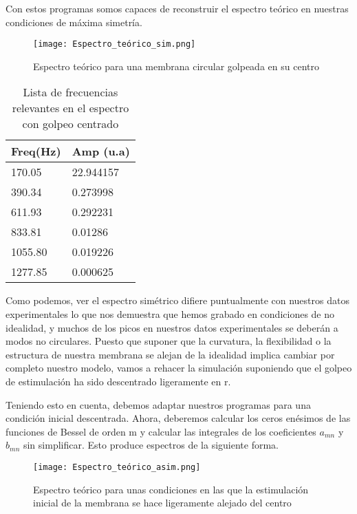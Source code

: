 \documentclass[journal, a4paper,onecolumn]{IEEEtran}
\begin{document}
Con estos programas somos capaces de reconstruir el espectro teórico en nuestras condiciones de máxima simetría.

\begin{figure}[H]
    \centering
    \texttt{[image: Espectro\_teórico\_sim.png]}
    \caption{Espectro teórico para una membrana circular golpeada en su centro}
    
\end{figure}

\begin{table}[H]
\centering
\begin{tabular}{l|l}
Freq(Hz) & Amp (u.a) \\ \hline
170.05   & 22.944157 \\ \hline
390.34   & 0.273998  \\ \hline
611.93   & 0.292231  \\ \hline
833.81   & 0.01286   \\ \hline
1055.80  & 0.019226  \\ \hline
1277.85  & 0.000625 
\end{tabular}
\caption{Lista de frecuencias relevantes en el espectro con golpeo centrado}
\end{table}

Como podemos, ver el espectro simétrico difiere puntualmente con nuestros datos experimentales lo que nos demuestra que hemos grabado en condiciones de no idealidad, y muchos de los picos en nuestros datos experimentales se deberán a modos no circulares. Puesto que suponer que la curvatura, la flexibilidad o la estructura de nuestra membrana se alejan de la idealidad implica cambiar por completo nuestro modelo, vamos a rehacer la simulación suponiendo que el golpeo de estimulación ha sido descentrado ligeramente en r. \newline

Teniendo esto en cuenta, debemos adaptar nuestros programas para una condición inicial descentrada. Ahora, deberemos calcular los ceros enésimos de las funciones de Bessel de orden m y calcular las integrales de los coeficientes $a_{mn}$ y $b_{mn}$ sin simplificar. Esto produce espectros de la siguiente forma.

\begin{figure}[H]
    \centering
    \texttt{[image: Espectro\_teórico\_asim.png]}
    \caption{Espectro teórico para unas condiciones en las que la estimulación inicial de la membrana se hace ligeramente alejado del centro}
\end{figure}
\end{document}
